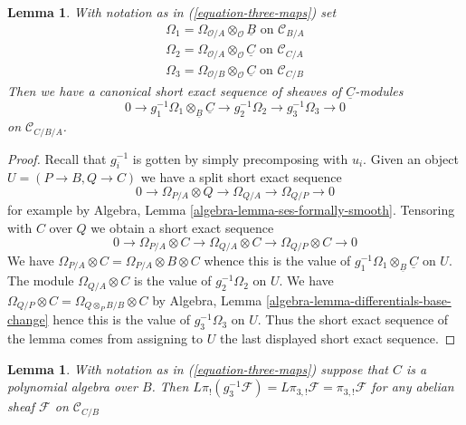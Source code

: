 \documentclass{stacks-project}
\theoremstyle{plain}
\newtheorem{lemma}[subsection]{Lemma}
\theoremstyle{definition}
\theoremstyle{remark}
\numberwithin{equation}{subsection}
\begin{document}
\begin{lemma}
\label{lemma-triangle-ses}
With notation as in (\ref{equation-three-maps}) set
$$
\begin{matrix}
\Omega_1 = \Omega_{\mathcal{O}/A} \otimes_\mathcal{O} \underline{B}
\text{ on }\mathcal{C}_{B/A} \\
\Omega_2 = \Omega_{\mathcal{O}/A} \otimes_\mathcal{O} \underline{C}
\text{ on }\mathcal{C}_{C/A} \\
\Omega_3 = \Omega_{\mathcal{O}/B} \otimes_\mathcal{O} \underline{C}
\text{ on }\mathcal{C}_{C/B}
\end{matrix}
$$
Then we have a canonical short exact sequence of sheaves
of $\underline{C}$-modules
$$
0 \to g_1^{-1}\Omega_1 \otimes_{\underline{B}} \underline{C} \to
g_2^{-1}\Omega_2 \to
g_3^{-1}\Omega_3 \to 0
$$
on $\mathcal{C}_{C/B/A}$.
\end{lemma}

\begin{proof}
Recall that $g_i^{-1}$ is gotten by simply precomposing with $u_i$.
Given an object $U = (P \to B, Q \to C)$ we have a split
short exact sequence
$$
0 \to \Omega_{P/A} \otimes Q \to \Omega_{Q/A} \to \Omega_{Q/P} \to 0
$$
for example by Algebra, Lemma \ref{algebra-lemma-ses-formally-smooth}.
Tensoring with $C$ over $Q$ we obtain a short exact sequence
$$
0 \to \Omega_{P/A} \otimes C \to \Omega_{Q/A} \otimes C \to
\Omega_{Q/P} \otimes C \to 0
$$
We have $\Omega_{P/A} \otimes C = \Omega_{P/A} \otimes B \otimes C$
whence this is the value of
$g_1^{-1}\Omega_1 \otimes_{\underline{B}} \underline{C}$
on $U$. The module $\Omega_{Q/A} \otimes C$ is the value of
$g_2^{-1}\Omega_2$ on $U$.
We have $\Omega_{Q/P} \otimes C = \Omega_{Q \otimes_P B/B} \otimes C$
by Algebra, Lemma \ref{algebra-lemma-differentials-base-change}
hence this is the value of
$g_3^{-1}\Omega_3$ on $U$. Thus the short exact sequence of the
lemma comes from assigning to $U$ the last displayed short exact
sequence.
\end{proof}

\begin{lemma}
\label{lemma-polynomial-on-top}
With notation as in (\ref{equation-three-maps})
suppose that $C$ is a polynomial algebra over $B$. Then
$L\pi_!(g_3^{-1}\mathcal{F}) = L\pi_{3, !}\mathcal{F} = \pi_{3, !}\mathcal{F}$
for any abelian sheaf $\mathcal{F}$ on $\mathcal{C}_{C/B}$
\end{lemma}
\end{document}
